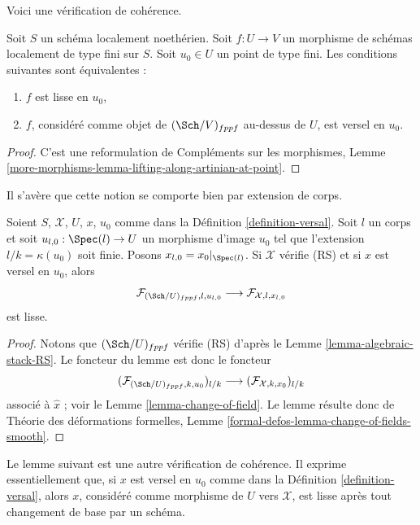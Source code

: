 \noindent
Voici une vérification de cohérence.

\begin{lemma}
\label{lemma-versal-implies-smooth}
Soit $S$ un schéma localement noethérien. Soit $f : U \to V$
un morphisme de schémas localement de type fini sur $S$.
Soit $u_0 \in U$ un point de type fini. Les conditions suivantes sont équivalentes :
\begin{enumerate}
\item $f$ est lisse en $u_0$,
\item $f$, considéré comme objet de $(\Sch/V)_{fppf}$ au-dessus de $U$, est
versel en $u_0$.
\end{enumerate}
\end{lemma}

\begin{proof}
C'est une reformulation de Compléments sur les morphismes, Lemme
\ref{more-morphisms-lemma-lifting-along-artinian-at-point}.
\end{proof}

\noindent
Il s'avère que cette notion se comporte bien par
extension de corps.

\begin{lemma}
\label{lemma-versal-change-of-field}
Soient $S$, $\mathcal{X}$, $U$, $x$, $u_0$ comme dans la
Définition \ref{definition-versal}. Soit $l$ un corps et soit
$u_{l, 0} : \Spec(l) \to U$ un morphisme d'image $u_0$ tel que
l'extension $l/k = \kappa(u_0)$ soit finie. Posons $x_{l, 0} = x_0|_{\Spec(l)}$.
Si $\mathcal{X}$ vérifie (RS) et si $x$ est versel en $u_0$, alors
$$
\mathcal{F}_{(\Sch/U)_{fppf}, l, u_{l, 0}}
\longrightarrow
\mathcal{F}_{\mathcal{X}, l, x_{l, 0}}
$$
est lisse.
\end{lemma}

\begin{proof}
Notons que $(\Sch/U)_{fppf}$ vérifie (RS) d'après le
Lemme \ref{lemma-algebraic-stack-RS}.
Le foncteur du lemme est donc le foncteur
$$
(\mathcal{F}_{(\Sch/U)_{fppf}, k , u_0})_{l/k}
\longrightarrow
(\mathcal{F}_{\mathcal{X}, k , x_0})_{l/k}
$$
associé à $\hat x$ ; voir le Lemme \ref{lemma-change-of-field}.
Le lemme résulte donc de
Théorie des déformations formelles, Lemme
\ref{formal-defos-lemma-change-of-fields-smooth}.
\end{proof}

\noindent
Le lemme suivant est une autre vérification de cohérence. Il
exprime essentiellement que, si $x$ est versel en $u_0$ comme dans la
Définition \ref{definition-versal},
alors $x$, considéré comme morphisme de $U$ vers $\mathcal{X}$, est
lisse après tout changement de base par un schéma.

